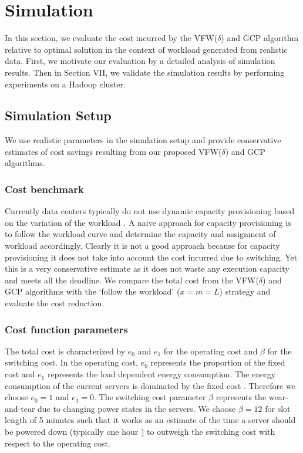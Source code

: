 \documentclass[10pt,conference,compsocconf,letterpaper]{IEEEtran}
\begin{document}
\section{Simulation}
In this section, we evaluate the cost incurred by the VFW($\delta$) and GCP algorithm relative to optimal solution in the context of workload generated from realistic data. First, we motivate our evaluation by a detailed analysis of simulation results. Then in Section VII, we validate the simulation results by performing experiments on a Hadoop cluster.



\subsection{Simulation Setup}
We use realistic parameters in the simulation setup and provide conservative estimates of cost savings resulting from our proposed VFW($\delta$) and GCP algorithms.



\subsubsection*{Cost benchmark}
Currently data centers typically do not use dynamic capacity provisioning based on the variation of the workload \cite{9}. A naive approach for capacity provisioning is to follow the workload curve and determine the capacity and assignment of workload accordingly. Clearly it is not a good approach because for capacity provisioning it does not take into account the cost incurred due to switching. Yet this is a very conservative estimate as it does not waste any execution capacity and meets all the deadline. We compare the total cost from the VFW($\delta$) and GCP algorithms with the `follow the workload' ($x=m=L$) strategy and evaluate the cost reduction.



\subsubsection*{Cost function parameters}
The total cost is characterized by $e_0$ and $e_1$ for the operating cost and $\beta$ for the switching cost. In the operating cost, $e_0$ represents the proportion of the fixed cost and $e_1$ represents the load dependent energy consumption.  The energy consumption of the current servers is dominated by the fixed cost \cite{19}. Therefore we choose $e_0 = 1$ and $e_1 = 0$. The switching cost parameter $\beta$ represents the wear-and-tear due to changing power states in the servers. We choose $\beta =12$ for slot length of 5 minutes such that it works as an estimate of the time a server should be powered down (typically one hour \cite{9,21}) to outweigh the switching cost with respect to the operating cost.
\end{document}
